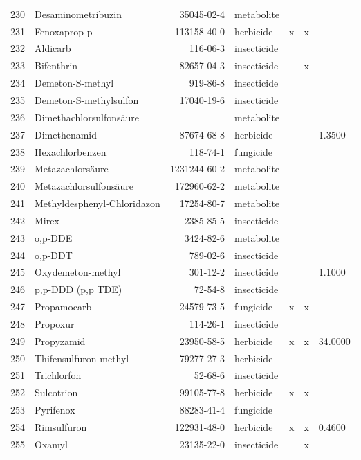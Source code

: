 \begin{longtable}{lp{3cm}rlp{0.5cm}p{0.5cm}p{1.5cm}}
  230 & Desaminometribuzin & 35045-02-4 & metabolite &  &  &  \\ 
  231 & Fenoxaprop-p & 113158-40-0 & herbicide & x & x &  \\ 
  232 & Aldicarb & 116-06-3 & insecticide &  &  &  \\ 
  233 & Bifenthrin & 82657-04-3 & insecticide &  & x &  \\ 
  234 & Demeton-S-methyl & 919-86-8 & insecticide &  &  &  \\ 
  235 & Demeton-S-methylsulfon & 17040-19-6 & insecticide &  &  &  \\ 
  236 & Dimethachlorsulfonsäure &  & metabolite &  &  &  \\ 
  237 & Dimethenamid & 87674-68-8 & herbicide &  &  & 1.3500 \\ 
  238 & Hexachlorbenzen & 118-74-1 & fungicide &  &  &  \\ 
  239 & Metazachlorsäure & 1231244-60-2 & metabolite &  &  &  \\ 
  240 & Metazachlorsulfonsäure & 172960-62-2 & metabolite &  &  &  \\ 
  241 & Methyldesphenyl-Chloridazon & 17254-80-7 & metabolite &  &  &  \\ 
  242 & Mirex & 2385-85-5 & insecticide &  &  &  \\ 
  243 & o,p-DDE & 3424-82-6 & metabolite &  &  &  \\ 
  244 & o,p-DDT & 789-02-6 & insecticide &  &  &  \\ 
  245 & Oxydemeton-methyl & 301-12-2 & insecticide &  &  & 1.1000 \\ 
  246 & p,p-DDD (p,p TDE) & 72-54-8 & insecticide &  &  &  \\ 
  247 & Propamocarb & 24579-73-5 & fungicide & x & x &  \\ 
  248 & Propoxur & 114-26-1 & insecticide &  &  &  \\ 
  249 & Propyzamid & 23950-58-5 & herbicide & x & x & 34.0000 \\ 
  250 & Thifensulfuron-methyl & 79277-27-3 & herbicide &  &  &  \\ 
  251 & Trichlorfon & 52-68-6 & insecticide &  &  &  \\ 
  252 & Sulcotrion & 99105-77-8 & herbicide & x & x &  \\ 
  253 & Pyrifenox & 88283-41-4 & fungicide &  &  &  \\ 
  254 & Rimsulfuron & 122931-48-0 & herbicide & x & x & 0.4600 \\ 
  255 & Oxamyl & 23135-22-0 & insecticide &  & x &  \\ 

\end{longtable}
